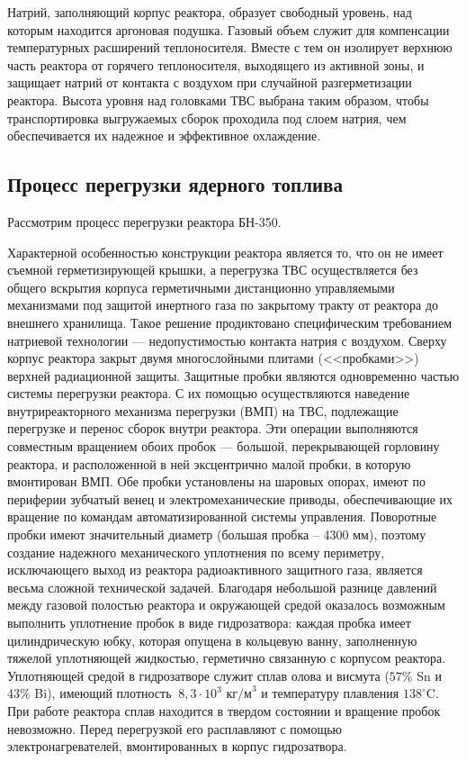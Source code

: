 Натрий, заполняющий корпус реактора, образует свободный уровень, над которым находится аргоновая подушка.
Газовый объем служит для компенсации температурных расширений теплоносителя.
Вместе с тем он изолирует верхнюю часть реактора от горячего теплоносителя, выходящего из активной зоны, и защищает натрий от контакта с воздухом при случайной разгерметизации реактора.
Высота уровня над головками ТВС выбрана таким образом, чтобы транспортировка выгружаемых сборок проходила под слоем натрия, чем обеспечивается их надежное и эффективное охлаждение.
\cite{BH}


\subsection{Процесс перегрузки ядерного топлива}

Рассмотрим процесс перегрузки реактора БН-350.

Характерной особенностью конструкции реактора является то, что он не имеет съемной герметизирующей крышки, а перегрузка ТВС осуществляется без общего вскрытия корпуса герметичными дистанционно управляемыми механизмами под защитой инертного газа по закрытому тракту от реактора до внешнего хранилища.
Такое решение продиктовано специфическим требованием натриевой технологии --- недопустимостью контакта натрия с воздухом.
Сверху корпус реактора закрыт двумя многослойными плитами (<<пробками>>) верхней радиационной защиты.
Защитные пробки являются одновременно частью системы перегрузки реактора.
С их помощью осуществляются наведение внутриреакторного механизма перегрузки (ВМП) на ТВС, подлежащие перегрузке и перенос сборок внутри реактора. 
Эти операции выполняются совместным вращением обоих пробок --- большой, перекрывающей горловину реактора, и расположенной в ней эксцентрично малой пробки, в которую вмонтирован ВМП.
Обе пробки установлены на шаровых опорах, имеют по периферии зубчатый венец и электромеханические приводы, обеспечивающие их вращение по командам автоматизированной системы управления.
Поворотные пробки имеют значительный диаметр (большая пробка -- 4300 мм), поэтому создание надежного механического уплотнения по всему периметру, исключающего выход из реактора радиоактивного защитного газа, является весьма сложной технической задачей.
Благодаря небольшой разнице давлений между газовой полостью реактора и окружающей средой оказалось возможным выполнить уплотнение пробок в виде гидрозатвора: каждая пробка имеет цилиндрическую юбку, которая опущена в кольцевую ванну, заполненную тяжелой уплотняющей жидкостью, герметично связанную с корпусом реактора.
Уплотняющей средой в гидрозатворе служит сплав олова и висмута ($57\%$ Sn и $43\%$ Bi), имеющий плотность $~8,3\cdot10^3 \text{~кг/м}^3$ и температуру плавления $138^{\circ}\text{C}$.
При работе реактора сплав находится в твердом состоянии и вращение пробок невозможно.
Перед перегрузкой его расплавляют с помощью электронагревателей, вмонтированных в корпус гидрозатвора.

